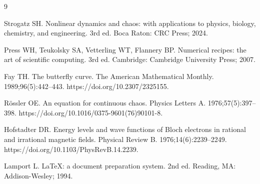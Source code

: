 %
%
%

{}
\label{References_toc}

\begin{thebibliography}{9}

	Strogatz SH. Nonlinear dynamics and chaos: with applications to physics,
	biology, chemistry, and engineering. 3rd ed. Boca Raton: CRC Press; 2024.

	Press WH, Teukolsky SA, Vetterling WT, Flannery BP. Numerical recipes: the
	art of scientific computing. 3rd ed. Cambridge: Cambridge University Press;
	2007.

	Fay TH. The butterfly curve. The American Mathematical Monthly.
	1989;96(5):442--443. https://doi.org/10.2307/2325155.

	R\"ossler OE. An equation for continuous chaos. Physics Letters A.
	1976;57(5):397--398. https://doi.org/10.1016/0375-9601(76)90101-8.

	Hofstadter DR. Energy levels and wave functions of Bloch electrons in
	rational and irrational magnetic fields. Physical Review B.
	1976;14(6):2239--2249. https://doi.org/10.1103/PhysRevB.14.2239.

	Lamport L. LaTeX: a document preparation system. 2nd ed. Reading, MA:
	Addison-Wesley; 1994.

\end{thebibliography}
